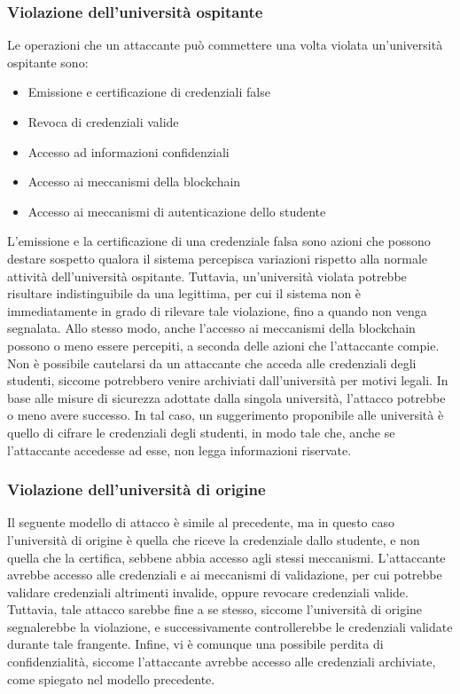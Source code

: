 \documentclass[a4paper,12pt]{article}
\begin{document}
\subsubsection{Violazione dell’università ospitante}
Le operazioni che un attaccante può commettere una volta violata un'università ospitante sono:
\begin{itemize}
    \item Emissione e certificazione di credenziali false
    \item Revoca di credenziali valide
    \item Accesso ad informazioni confidenziali
    \item Accesso ai meccanismi della blockchain
    \item Accesso ai meccanismi di autenticazione dello studente 
\end{itemize}
L'emissione e la certificazione di una credenziale falsa sono azioni che possono destare sospetto qualora il sistema percepisca variazioni rispetto alla normale attività dell'università ospitante. 
Tuttavia, un'università violata potrebbe risultare indistinguibile da una legittima, per cui il sistema non è immediatamente in grado di rilevare tale violazione, fino a quando non venga segnalata.
Allo stesso modo, anche l'accesso ai meccanismi della blockchain possono o meno essere percepiti, a seconda delle azioni che l'attaccante compie.
\newline  Non è possibile cautelarsi da un attaccante che acceda alle credenziali degli studenti, siccome potrebbero venire archiviati dall'università per motivi legali. In base alle misure di sicurezza adottate dalla singola università, l'attacco potrebbe o meno avere successo. In tal caso, un suggerimento proponibile alle università è quello di cifrare le credenziali degli studenti, in modo tale che, anche se l'attaccante accedesse ad esse, non legga informazioni riservate.
\subsubsection{Violazione dell’università di origine}
Il seguente modello di attacco è simile al precedente, ma in questo caso l'università di origine è quella che riceve la credenziale dallo studente, e non quella che la certifica, sebbene abbia accesso agli stessi meccanismi. 
\newline L'attaccante avrebbe accesso alle credenziali e ai meccanismi di validazione, per cui potrebbe validare credenziali altrimenti invalide, oppure revocare credenziali valide.
Tuttavia, tale attacco sarebbe fine a se stesso, siccome l'università di origine segnalerebbe la violazione, e successivamente controllerebbe le credenziali validate durante tale frangente. 
Infine, vi è comunque una possibile perdita di confidenzialità, siccome l'attaccante avrebbe accesso alle credenziali archiviate,  come spiegato nel modello precedente.
\end{document}
